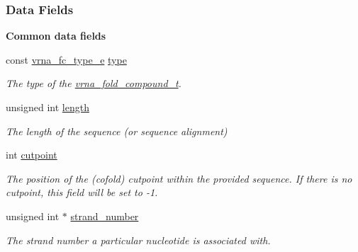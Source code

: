 \subsubsection*{Data Fields}
\begin{Indent}\textbf{ Common data fields}\par
\begin{DoxyCompactItemize}
\item 
const \hyperlink{group__fold__compound_ga01a4ff86fa71deaaa5d1abbd95a1447d}{vrna\+\_\+fc\+\_\+type\+\_\+e} \hyperlink{group__fold__compound_a391bcf8ac5997784aaf780cdd251c464}{type}
\begin{DoxyCompactList}\small\item\em The type of the \hyperlink{group__fold__compound_ga1b0cef17fd40466cef5968eaeeff6166}{vrna\+\_\+fold\+\_\+compound\+\_\+t}. \end{DoxyCompactList}\item 
\mbox{\label{group__fold__compound_a95fbfed770b858e50c766505dc4bf998}} 
unsigned int \hyperlink{group__fold__compound_a95fbfed770b858e50c766505dc4bf998}{length}
\begin{DoxyCompactList}\small\item\em The length of the sequence (or sequence alignment) \end{DoxyCompactList}\item 
\mbox{\label{group__fold__compound_ae1a7bbff0256577e2b22709bac11fdb4}} 
int \hyperlink{group__fold__compound_ae1a7bbff0256577e2b22709bac11fdb4}{cutpoint}
\begin{DoxyCompactList}\small\item\em The position of the (cofold) cutpoint within the provided sequence. If there is no cutpoint, this field will be set to -\/1. \end{DoxyCompactList}\item 
\mbox{\label{group__fold__compound_a23304c5186dfae97bc69dc19d37f70c3}} 
unsigned int $\ast$ \hyperlink{group__fold__compound_a23304c5186dfae97bc69dc19d37f70c3}{strand\+\_\+number}
\begin{DoxyCompactList}\small\item\em The strand number a particular nucleotide is associated with. \end{DoxyCompactList}\item 
\mbox{\label{group__fold__compound_a3bf15e0e44539f9f622fd09227bf3de1}} 

\end{DoxyCompactItemize}
\end{Indent}
